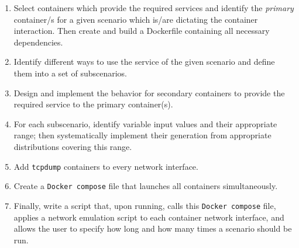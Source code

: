 \documentclass[sigconf]{acmart}
\begin{document}
\begin{enumerate}

\item Select containers which provide the required services and identify the \textit{primary} container/s for a given scenario which is/are dictating the container interaction. Then create and build a Dockerfile containing all necessary dependencies. 

 


\item Identify different ways to use the service of the given scenario and define them into a set of subscenarios. 

\item Design and implement the behavior for secondary containers to provide the required service to the primary container(s).

\item For each subscenario, identify variable input values and their appropriate range; then systematically implement their generation from appropriate distributions covering this range.
 
\item Add \texttt{tcpdump} containers to every network interface.

\item Create a \texttt{Docker compose} file that launches all containers simultaneously.%

\item Finally, write a script that, upon running, calls this \texttt{Docker compose} file, applies a network emulation script to each container network interface, and allows the user to specify how long and how many times a scenario should be run. %



\end{enumerate}
\end{document}
